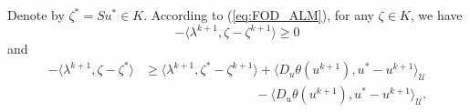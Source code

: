 \documentclass[leqno]{amsart}
\theoremstyle{definition}
\begin{document}
Denote by $\zeta^* = Su^* \in K$.  According to (\ref{eq:FOD_ALM}), for any $\zeta\in K$, we have
\begin{equation}\nonumber
-\langle\lambda^{k+1} ,\zeta - \zeta^{k+1} \rangle \geq 0
\end{equation}
and
\begin{equation}\label{eq:w-pre1}
\begin{aligned}
- \langle\lambda^{k+1} ,\zeta - \zeta^*\rangle
& \geq \langle \lambda^{k+1}, \zeta^* - \zeta^{k+1}\rangle +  \langle D_u\theta(u^{k+1}), u^* - u^{k+1} \rangle_\mathcal{U} \\
&\quad\quad \quad\quad\quad \quad\quad\quad \ \ \  -  \langle D_u\theta(u^{k+1}), u^* - u^{k+1} \rangle_\mathcal{U}.
\end{aligned}
\end{equation}
\end{document}
